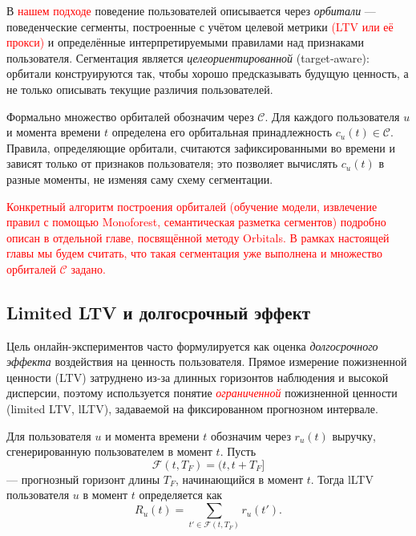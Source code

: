 В \textcolor{red}{нашем подходе} поведение пользователей описывается через
\textit{орбитали} — поведенческие сегменты, построенные с учётом
целевой метрики \textcolor{red}{(LTV или её прокси)} и определённые
интерпретируемыми правилами над признаками пользователя. Сегментация
является \textit{целеориентированной} (target‑aware): орбитали
конструируются так, чтобы хорошо предсказывать будущую ценность,
а не только описывать текущие различия пользователей.

Формально множество орбиталей обозначим через $\mathcal{C}$. Для
каждого пользователя $u$ и момента времени $t$ определена его
орбитальная принадлежность $c_u(t) \in \mathcal{C}$. Правила,
определяющие орбитали, считаются зафиксированными во времени и
зависят только от признаков пользователя; это позволяет вычислять
$c_u(t)$ в разные моменты, не изменяя саму схему сегментации.

\textcolor{red}{
Конкретный алгоритм построения орбиталей (обучение модели,
извлечение правил с помощью Monoforest, семантическая разметка
сегментов) подробно описан в отдельной главе, посвящённой методу
Orbitals. В рамках настоящей главы мы будем считать, что такая
сегментация уже выполнена и множество орбиталей $\mathcal{C}$
задано.}

\subsection{Limited LTV и долгосрочный эффект}
\label{subsec:lltv}

Цель онлайн-экспериментов часто формулируется как оценка
\textit{долгосрочного эффекта} воздействия на ценность пользователя.
Прямое измерение пожизненной ценности (LTV) затруднено из-за длинных
горизонтов наблюдения и высокой дисперсии, поэтому используется понятие
\textcolor{red}{\textit{ограниченной}} пожизненной ценности (limited LTV, lLTV), задаваемой
на фиксированном прогнозном интервале.

Для пользователя $u$ и момента времени $t$ обозначим через $r_u(t)$
выручку, сгенерированную пользователем в момент $t$. Пусть
\[
  \mathcal{F}(t, T_F) = (t, t + T_F]
\]
— прогнозный горизонт длины $T_F$, начинающийся в момент $t$.
Тогда lLTV пользователя $u$ в момент $t$ определяется как
\begin{equation}
    R_u(t) = \sum_{t' \in \mathcal{F}(t, T_F)} r_u(t').
\end{equation}

